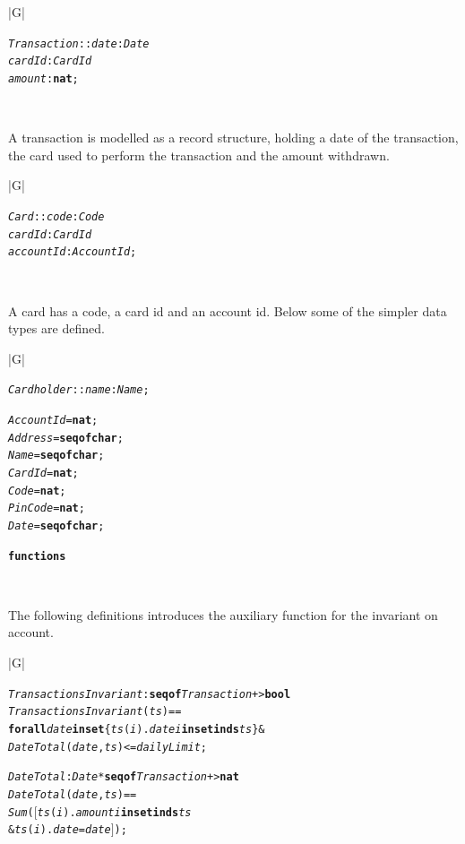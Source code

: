 \documentclass[\pformat,12pt,twoside]{article}
\newenvironment{VDMgray}%
{\begin{tabular}{|G|}\hline\small\begin{alltt}}%
{\end{alltt}\normalsize\\
 \hline\end{tabular}}
\begin{document}
\begin{VDMgray}
 \textit{Transaction} :: \textit{date} : \textit{Date}
                \textit{cardId} : \textit{CardId}
                \textit{amount} : \textbf{nat};
\end{VDMgray}


A transaction is modelled as a record structure, holding a date 
of the transaction, the card used to perform the transaction 
and the amount withdrawn.

\begin{VDMgray}
 \textit{Card} :: \textit{code} : \textit{Code}
         \textit{cardId} : \textit{CardId}
         \textit{accountId} : \textit{AccountId};
\end{VDMgray}


A card has a code, a card id and an account id. Below some of 
the simpler data types are defined.

\begin{VDMgray}
 \textit{Cardholder} :: \textit{name} : \textit{Name};

 \textit{AccountId} = \textbf{nat};
 \textit{Address} = \textbf{seq} \textbf{of} \textbf{char};
 \textit{Name} = \textbf{seq} \textbf{of} \textbf{char};
 \textit{CardId} = \textbf{nat};
 \textit{Code} = \textbf{nat};
 \textit{PinCode} = \textbf{nat};
 \textit{Date} = \textbf{seq} \textbf{of} \textbf{char};

\textbf{functions}
\end{VDMgray}


The following definitions introduces the auxiliary function for 
the invariant on account.

\begin{VDMgray}
 \textit{TransactionsInvariant} : \textbf{seq} \textbf{of} \textit{Transaction} +\texttt{>} \textbf{bool}
 \textit{TransactionsInvariant}(\textit{ts}) ==
 \textbf{forall} \textit{date} \textbf{in set} \{\textit{ts}(\textit{i}).\textit{date} {\textbar} \textit{i} \textbf{in set} \textbf{inds} \textit{ts}\} \&
        \textit{DateTotal}(\textit{date},\textit{ts}) \texttt{<}= \textit{dailyLimit};

 \textit{DateTotal} : \textit{Date} * \textbf{seq} \textbf{of} \textit{Transaction} +\texttt{>} \textbf{nat}
 \textit{DateTotal}(\textit{date},\textit{ts}) ==
   \textit{Sum}(\ensuremath{[}\textit{ts}(\textit{i}).\textit{amount} {\textbar} \textit{i} \textbf{in set} \textbf{inds} \textit{ts} 
                    \& \textit{ts}(\textit{i}).\textit{date} = \textit{date}\ensuremath{]});
\end{VDMgray}
\end{document}
